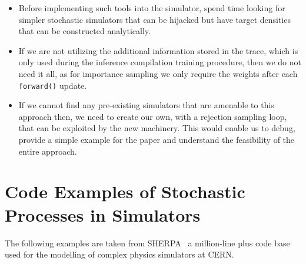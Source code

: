\documentclass{article}
\begin{document}
\begin{itemize}
\item Before implementing such tools into the simulator, spend time looking for simpler stochastic simulators 
that can be hijacked but have target densities that can be constructed analytically. 
\item If we are not utilizing the additional information stored in the trace, which is only used during the inference compilation
training procedure, then we do not need it all, as for importance sampling we only require the weights after each \texttt{forward()}
update. 
\item If we cannot find any pre-existing simulators that are amenable to this approach then, we need to create our own, with
a rejection sampling loop, that can be exploited by the new machinery. This would enable us to debug, provide a simple example 
for the paper and understand the feasibility of the entire approach. 
\end{itemize}




\appendix

\section{Code Examples of Stochastic Processes in Simulators }

The following examples are taken from SHERPA~\cite{gleisberg2009event}
a million-line plus code base used for the modelling of complex physics
simulators at CERN. 
\end{document}
